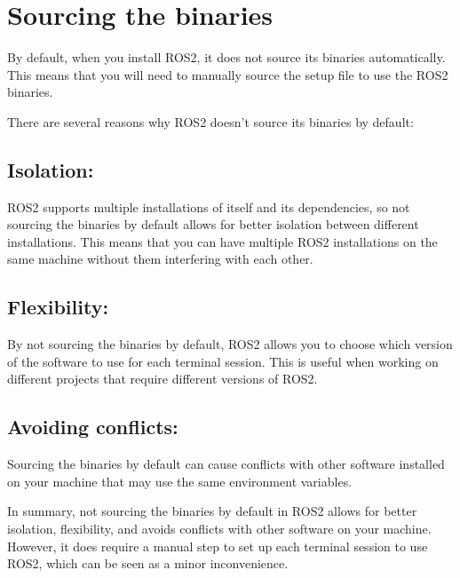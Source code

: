 \documentclass[
  letterpaper,
  DIV=11,
  numbers=noendperiod]{scrreprt}
\begin{document}
\hypertarget{sourcing-the-binaries}{%
\section{Sourcing the binaries}\label{sourcing-the-binaries}}

By default, when you install ROS2, it does not source its binaries
automatically. This means that you will need to manually source the
setup file to use the ROS2 binaries.

There are several reasons why ROS2 doesn't source its binaries by
default:

\hypertarget{isolation}{%
\subsection{Isolation:}\label{isolation}}

ROS2 supports multiple installations of itself and its dependencies, so
not sourcing the binaries by default allows for better isolation between
different installations. This means that you can have multiple ROS2
installations on the same machine without them interfering with each
other.

\hypertarget{flexibility}{%
\subsection{Flexibility:}\label{flexibility}}

By not sourcing the binaries by default, ROS2 allows you to choose which
version of the software to use for each terminal session. This is useful
when working on different projects that require different versions of
ROS2.

\hypertarget{avoiding-conflicts}{%
\subsection{Avoiding conflicts:}\label{avoiding-conflicts}}

Sourcing the binaries by default can cause conflicts with other software
installed on your machine that may use the same environment variables.

In summary, not sourcing the binaries by default in ROS2 allows for
better isolation, flexibility, and avoids conflicts with other software
on your machine. However, it does require a manual step to set up each
terminal session to use ROS2, which can be seen as a minor
inconvenience.
\end{document}

